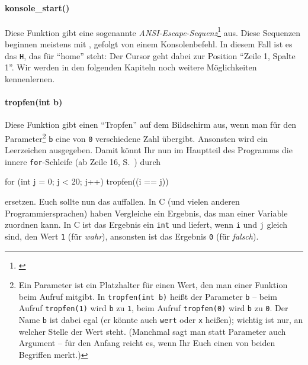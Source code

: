 \paragraph{konsole\_start()}
Diese Funktion gibt eine sogenannte \emph{ANSI-Escape-Sequenz}\footnote{\cite{wikipedia:ansi-escape}} aus. Diese Sequenzen beginnen meistens mit \esc{x1b[}, gefolgt von einem Konsolenbefehl. In diesem Fall ist es das \texttt{H}, das für ``home'' steht: Der Cursor geht dabei zur Position ``Zeile 1, Spalte 1''. Wir werden in den folgenden Kapiteln noch weitere Möglichkeiten kennenlernen.

\paragraph{tropfen(int b)}
Diese Funktion gibt einen ``Tropfen'' auf dem Bildschirm aus, wenn man für den Parameter\footnote{%
    Ein Parameter ist ein Platzhalter für einen Wert, den man einer Funktion beim Aufruf mitgibt. In \texttt{tropfen(int b)} heißt der Parameter \texttt{b} -- beim Aufruf \texttt{tropfen(1)} wird \texttt{b} zu \texttt{1}, beim Aufruf \texttt{tropfen(0)} wird \texttt{b} zu \texttt{0}. Der Name \texttt{b} ist dabei egal (er könnte auch \texttt{wert} oder \texttt{x} heißen); wichtig ist nur, an welcher Stelle der Wert steht. (Manchmal sagt man statt Parameter auch Argument -- für den Anfang reicht es, wenn Ihr Euch einen von beiden Begriffen merkt.)}
\texttt{b} eine von \texttt{0} verschiedene Zahl übergibt. Ansonsten wird ein Leerzeichen ausgegeben. Damit könnt Ihr nun im Hauptteil des Programms die innere \texttt{for}-Schleife (ab Zeile 16, S.~\pageref{sec:c:lauflicht:program}) durch
\begin{code}[numbers=none]
    for (int j = 0; j < 20; j++) 
        tropfen((i == j))
\end{code}
ersetzen. Euch sollte nun das  auffallen. In C (und vielen anderen Programmiersprachen) haben Vergleiche ein Ergebnis, das man einer Variable zuordnen kann. In C ist das Ergebnis ein \texttt{int} und  liefert, wenn \texttt{i} und \texttt{j} gleich sind, den Wert \texttt{1} (für \emph{wahr}), ansonsten ist das Ergebnis \texttt{0} (für \emph{falsch}).

